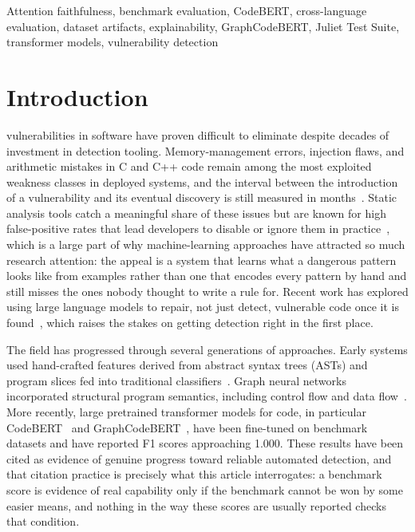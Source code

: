 \documentclass{ieeeaccess}
\begin{document}
\begin{keywords}
Attention faithfulness, benchmark evaluation, CodeBERT, cross-language evaluation, dataset artifacts, explainability, GraphCodeBERT, Juliet Test Suite, transformer models, vulnerability detection
\end{keywords}

\titlepgskip=-21pt

\maketitle

\raggedbottom

\section{Introduction}
\label{sec:intro}
 vulnerabilities in software have proven difficult to eliminate despite decades of investment in detection tooling. Memory-management errors, injection flaws, and arithmetic mistakes in C and C++ code remain among the most exploited weakness classes in deployed systems, and the interval between the introduction of a vulnerability and its eventual discovery is still measured in months~\cite{ref1}. Static analysis tools catch a meaningful share of these issues but are known for high false-positive rates that lead developers to disable or ignore them in practice~\cite{ref2}, which is a large part of why machine-learning approaches have attracted so much research attention: the appeal is a system that learns what a dangerous pattern looks like from examples rather than one that encodes every pattern by hand and still misses the ones nobody thought to write a rule for. Recent work has explored using large language models to repair, not just detect, vulnerable code once it is found~\cite{ref3}, which raises the stakes on getting detection right in the first place.

The field has progressed through several generations of approaches. Early systems used hand-crafted features derived from abstract syntax trees (ASTs) and program slices fed into traditional classifiers~\cite{ref4,ref5}. Graph neural networks incorporated structural program semantics, including control flow and data flow~\cite{ref6}. More recently, large pretrained transformer models for code, in particular CodeBERT~\cite{ref7} and GraphCodeBERT~\cite{ref8}, have been fine-tuned on benchmark datasets and have reported F1 scores approaching 1.000. These results have been cited as evidence of genuine progress toward reliable automated detection, and that citation practice is precisely what this article interrogates: a benchmark score is evidence of real capability only if the benchmark cannot be won by some easier means, and nothing in the way these scores are usually reported checks that condition.
\end{document}
